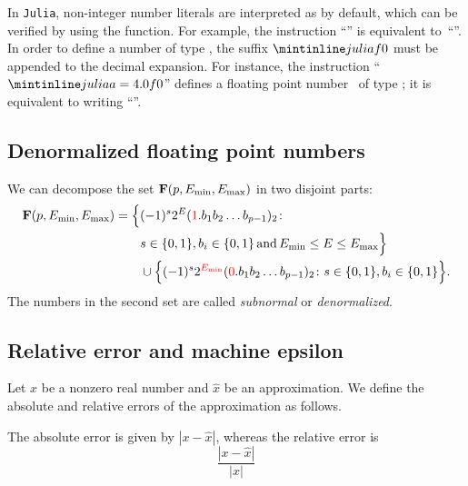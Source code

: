 In \texttt{Julia}, non-integer number literals are interpreted as  by default,
which can be verified by using the  function.
For example, the instruction ``'' is equivalent to~``''.
In order to define a number of type ,
the suffix $\julia{f0}$ must be appended to the decimal expansion.
For instance, the instruction ``$\julia{a = 4.0f0}$'' defines a floating point number~ of type ;
it is equivalent to writing ``''.

\subsection{Denormalized floating point numbers}%
\label{sub:defining_a_unique_representation}
We can decompose the set $\mathbf F(p, E_{\min}, E_{\max})$ in two disjoint parts:
\begin{align*}
    \label{eq:decomposition_normalized_denormalized}%
    \floating (p, E_{\min}, E_{\max})
    &= \Bigl\{ (-1)^s 2^E (\textcolor{red}{1}. b_1 b_2 \dots b_{p-1})_2 \colon \\
    & \qquad s \in \{0, 1\}, b_i \in \{0, 1\} \, \text{and} \, E_{\min} \leq E \leq E_{\max} \Bigr\} \\
    &\qquad \cup \Bigl\{  (-1)^s 2^{\textcolor{red}{E_{\min}}} (\textcolor{red}{0}. b_1 b_2 \dots b_{p-1})_2 \colon
     s \in \{0, 1\}, b_i \in \{0, 1\} \Bigr\}.
\end{align*}
The numbers in the second set are called \emph{subnormal} or \emph{denormalized}.

\subsection{Relative error and machine epsilon}%
\label{sub:relative_error_and_epsilon_machine}
Let $x$ be a nonzero real number and $\widehat x$ be an approximation.
We define the absolute and relative errors of the approximation as follows.
\begin{definition}
    The absolute error is given by $|x - \widehat x|$,
    whereas the relative error is
    \[
        \frac{|x - \widehat x|}{|x|}
    \]
\end{definition}

